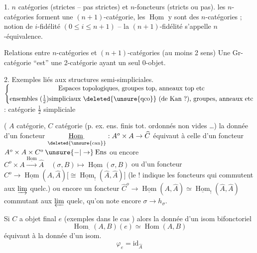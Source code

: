 1. $n$ catégories (strictes -- pas strictes) et $n$-foncteurs (stricts ou pas).
les $n$-catégories forment une $(n+1)$-catégorie, les $\underline{\operatorname{Hom}}$ y sont des
$n$-catégories ; notion de $i$-fidélité $(0\leq i\leq n+1)$ -- la $(n+1)$-fidélité
s'appelle $n$-équivalence.

Relations entre $n$-catégories et $(n+1)$-catégories  (au moins  2 sens)
Une Gr-catégorie ``est'' une 2-catégorie ayant un seul 0-objet.

2. Exemples liés aux structures semi-simpliciales.
$\left\{\begin{gathered}\text{Espaces topologiques, groupes top, anneaux top etc}\\
\text{ensembles }(\tfrac12)\text{simpliciaux }\deleted{\text{\unsure{qco}}}\text{ (de Kan ?), groupes, anneaux etc}\end{gathered}\right.$
 : catégorie $\frac12$ simpliciale

( $A$ catégorie, $C$  catégorie (p. ex. ens. finis tot. ordonnés non vides \ldots)
la donnée d'un foncteur $\underset{\deleted{\unsure{\rm can}}}{\underline{\operatorname{Hom}}_{\cdot}}:A^o\times A\to\widehat C$
équivaut à celle d'un foncteur $A^o\times A\times C^o\mathbin{\unsure{-|\to}}\mathrm{Ens}$ ou encore
$C^o\times A\xrightarrow{\underline{\operatorname{Hom}}}\widehat A\quad(\sigma,B)\mapsto\underline{\operatorname{Hom}}(\sigma,B)$ ou d'un foncteur \inserted{$\sigma\mathbin{-}\varphi_\sigma$}
$C^o\longrightarrow\underline{\operatorname{Hom}}(A,\widehat A)\bigl[\cong\underline{\operatorname{Hom}}_{!}(\widehat A,\widehat A)\bigr]$ (le $!$ indique les
foncteurs qui commutent aux $\varinjlim$ quelc.)  ou
encore un foncteur $\widehat{C}^{o}\to\underline{\operatorname{Hom}}(A,\widehat A)\simeq\underline{\operatorname{Hom}}_{!}(\widehat A,\widehat A)$
commutant aux $\varprojlim$ quelc, qu'on note encore $\sigma\to h_\sigma$.

Si $C$ a objet final $e$ (exemples dans le cas )
alors la donnée d'un isom bifonctoriel
\[
\operatorname{Hom}_{\cdot}(A,B)(e)\simeq\operatorname{Hom}(A,B)\tag*{($\alpha$)}
\]
équivaut à la donnée d'un isom.
\[
\varphi_e=\mathrm{id}_{\widehat A}\tag*{($\beta$)}
\]

